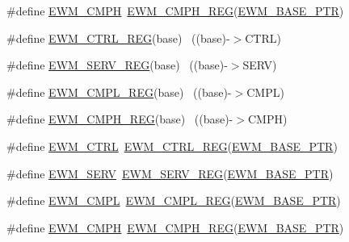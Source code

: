 \begin{DoxyCompactItemize}
\item 
\#define \hyperlink{group___e_w_m___register___accessor___macros_gaca7d16fcda675937b2e9df523618b7f9}{E\+W\+M\+\_\+\+C\+M\+PH}~\hyperlink{group___e_w_m___register___accessor___macros_gaec5eda9deb27ee641ebf5250bb0e1912}{E\+W\+M\+\_\+\+C\+M\+P\+H\+\_\+\+R\+EG}(\hyperlink{group___e_w_m___peripheral_gae3454b5b37183b746362498d1fafc40c}{E\+W\+M\+\_\+\+B\+A\+S\+E\+\_\+\+P\+TR})
\item 
\#define \hyperlink{group___e_w_m___register___accessor___macros_ga70c97c2b09cf89e94b72c64c3f988fb5}{E\+W\+M\+\_\+\+C\+T\+R\+L\+\_\+\+R\+EG}(base)                                          ~((base)-\/$>$C\+T\+RL)
\item 
\#define \hyperlink{group___e_w_m___register___accessor___macros_ga5a4ece1040c414bead7538079a9f4382}{E\+W\+M\+\_\+\+S\+E\+R\+V\+\_\+\+R\+EG}(base)                                          ~((base)-\/$>$S\+E\+RV)
\item 
\#define \hyperlink{group___e_w_m___register___accessor___macros_ga69212f48d4040eed832bd069e884bd47}{E\+W\+M\+\_\+\+C\+M\+P\+L\+\_\+\+R\+EG}(base)                                          ~((base)-\/$>$C\+M\+PL)
\item 
\#define \hyperlink{group___e_w_m___register___accessor___macros_gaec5eda9deb27ee641ebf5250bb0e1912}{E\+W\+M\+\_\+\+C\+M\+P\+H\+\_\+\+R\+EG}(base)                                          ~((base)-\/$>$C\+M\+PH)
\item 
\#define \hyperlink{group___e_w_m___register___accessor___macros_ga643f3468793754e6d82c2fd8cefb5df7}{E\+W\+M\+\_\+\+C\+T\+RL}~\hyperlink{group___e_w_m___register___accessor___macros_ga70c97c2b09cf89e94b72c64c3f988fb5}{E\+W\+M\+\_\+\+C\+T\+R\+L\+\_\+\+R\+EG}(\hyperlink{group___e_w_m___peripheral_gae3454b5b37183b746362498d1fafc40c}{E\+W\+M\+\_\+\+B\+A\+S\+E\+\_\+\+P\+TR})
\item 
\#define \hyperlink{group___e_w_m___register___accessor___macros_gad5ba7e470596823de41e4970dd7b8dee}{E\+W\+M\+\_\+\+S\+E\+RV}~\hyperlink{group___e_w_m___register___accessor___macros_ga5a4ece1040c414bead7538079a9f4382}{E\+W\+M\+\_\+\+S\+E\+R\+V\+\_\+\+R\+EG}(\hyperlink{group___e_w_m___peripheral_gae3454b5b37183b746362498d1fafc40c}{E\+W\+M\+\_\+\+B\+A\+S\+E\+\_\+\+P\+TR})
\item 
\#define \hyperlink{group___e_w_m___register___accessor___macros_ga80939a724dbc1614712bd9a4e148e95e}{E\+W\+M\+\_\+\+C\+M\+PL}~\hyperlink{group___e_w_m___register___accessor___macros_ga69212f48d4040eed832bd069e884bd47}{E\+W\+M\+\_\+\+C\+M\+P\+L\+\_\+\+R\+EG}(\hyperlink{group___e_w_m___peripheral_gae3454b5b37183b746362498d1fafc40c}{E\+W\+M\+\_\+\+B\+A\+S\+E\+\_\+\+P\+TR})
\item 
\#define \hyperlink{group___e_w_m___register___accessor___macros_gaca7d16fcda675937b2e9df523618b7f9}{E\+W\+M\+\_\+\+C\+M\+PH}~\hyperlink{group___e_w_m___register___accessor___macros_gaec5eda9deb27ee641ebf5250bb0e1912}{E\+W\+M\+\_\+\+C\+M\+P\+H\+\_\+\+R\+EG}(\hyperlink{group___e_w_m___peripheral_gae3454b5b37183b746362498d1fafc40c}{E\+W\+M\+\_\+\+B\+A\+S\+E\+\_\+\+P\+TR})
\end{DoxyCompactItemize}


